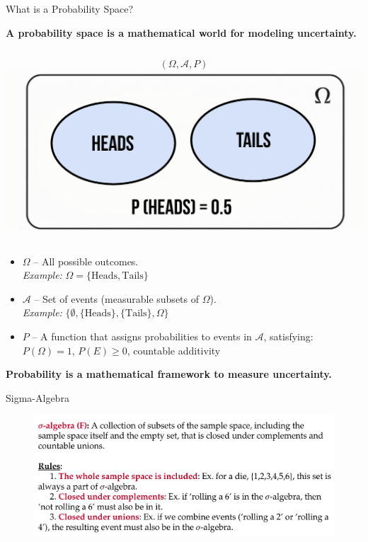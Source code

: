 \documentclass[handout,aspectratio=169]{beamer}
\begin{document}
\begin{frame}{What is a Probability Space?}
	    
	\textbf{A probability space is a mathematical world for modeling uncertainty.}
	\vspace{1em}
	\begin{columns}
		\[
			(\Omega, \mathcal{A}, P)
		\]
		\includegraphics[width=\linewidth]{figs/space.jpg}
	\end{columns}
	\begin{itemize}
		\item $\Omega$ – All possible outcomes. \\
		      \textit{Example:} $\Omega = \{\text{Heads}, \text{Tails}\}$
		\item $\mathcal{A}$ – Set of events (measurable subsets of $\Omega$). \\
		      \textit{Example:} $\{\emptyset, \{\text{Heads}\}, \{\text{Tails}\}, \Omega\}$
		\item $P$ – A function that assigns probabilities to events in $\mathcal{A}$, satisfying:\\
		      \quad $P(\Omega) = 1$, \quad $P(E) \geq 0$, \quad countable additivity
	\end{itemize}
	
	\vspace{0.5em}
	\textbf{Probability is a mathematical framework to measure uncertainty.}
\end{frame}

\begin{frame}{Sigma-Algebra}
  \begin{figure}[htbp]
		\centering
		\includegraphics[width=\textwidth]{figs/sigma_algebra.png}
	\end{figure}
\end{frame}
\end{document}
